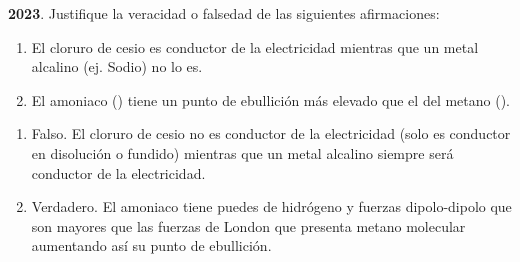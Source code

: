 \begin{exerciseEVAU}
    \textbf{2023}. Justifique la veracidad o falsedad de las siguientes afirmaciones:
    \begin{enumerate}[label=\letraminuscula]
        \item El cloruro de cesio es conductor de la electricidad mientras que un metal alcalino (ej. Sodio) no lo es.
        \item El amoniaco () tiene un punto de ebullición más elevado que el del metano ().
    \end{enumerate}

    \begin{solu}
        \begin{enumerate}[label=\letraminuscula]
            \item Falso.
            El cloruro de cesio no es conductor de la electricidad (solo es conductor en disolución o fundido) mientras que un metal alcalino siempre será conductor de la electricidad.
            \item Verdadero.
            El amoniaco tiene puedes de hidrógeno y fuerzas dipolo-dipolo que son mayores que las fuerzas de London que presenta metano molecular aumentando así su punto de ebullición.
        \end{enumerate}
    \end{solu}
\end{exerciseEVAU}


